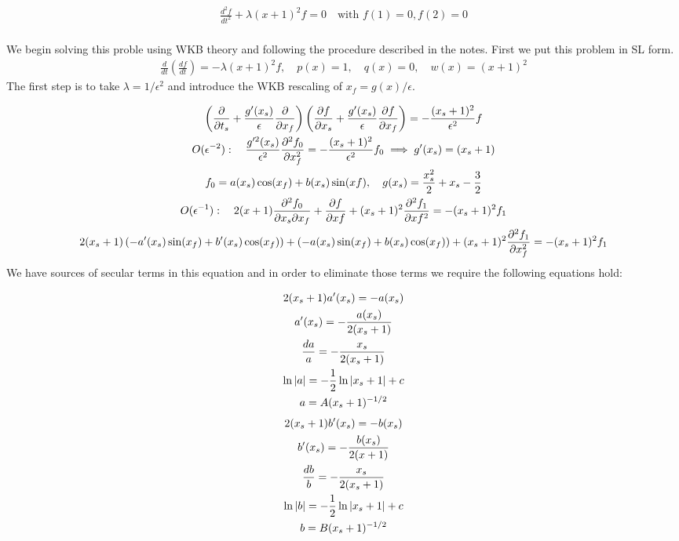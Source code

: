 \documentclass{article}
\begin{document}
\begin{gather*}
    \frac{d^2f}{dt^2} + \lambda(x+1)^2f = 0 \quad \text{with } f(1) = 0, f(2) =
    0\\
\end{gather*}

We begin solving this proble using WKB theory and following the procedure
described in the notes. First we put this problem in SL form. 
\begin{gather*}
    \frac{d}{dt}\left(\frac{df}{dt}\right) = -\lambda(x+1)^2f, \quad p(x) = 1,
    \quad q(x) = 0, \quad w(x) = (x+1)^2
\end{gather*}
The first step is to take $\lambda = 1/\epsilon^2$ and introduce the WKB
rescaling of $x_f = g(x)/\epsilon$. 

\begin{gather*}
    \left(\frac{\partial}{\partial t_s} + \frac{g'(x_s)}{\epsilon}
    \frac{\partial}{\partial x_f}\right)\left(\frac{\partial f}{\partial x_s} +
    \frac{g'(x_s)}{\epsilon}
    \frac{\partial f}{\partial x_f}\right) = -\frac{(x_s+1)^2}{\epsilon^2}f\\
    O(\epsilon^{-2}): \quad \frac{g'^2(x_s)}{\epsilon^2}\frac{\partial^2 f_0}{\partial x_f^2} = -
    \frac{(x_s+1)^2}{\epsilon^2}f_0 \implies g'(x_s) = (x_s+1)\\
    f_0 = a(x_s)\cos(x_f) + b(x_s)\sin(xf), \quad g(x_s) = \frac{x_s^2}{2} + x_s
    - \frac{3}{2}\\
    O(\epsilon^{-1}): \quad 2(x+1)\frac{\partial^2 f_0}{\partial
    x_s\partial x_f} + \frac{\partial f}{\partial xf} +
    (x_s+1)^2 \frac{\partial^2f_1}{\partial xf^2} = 
    - (x_s+1)^2f_1\\
    2(x_s+1)\left(-a'(x_s)\sin(x_f) + b'(x_s)\cos(x_f)\right) +
    \left(-a(x_s)\sin(x_f) + b(x_s)\cos(x_f)\right) +
    (x_s+1)^2\frac{\partial^2f_1}{\partial x_f^2} = -(x_s+1)^2f_1
\end{gather*}
We have sources of secular terms in this equation and in order to eliminate
those terms we require the following equations hold:

    \begin{gather*}
        2(x_s+1)a'(x_s) = -a(x_s)\\
        a'(x_s) = -\frac{a(x_s)}{2(x_s+1)}\\
        \frac{da}{a} = -\frac{x_s}{2(x_s+1)}\\
        \ln|a| = -\frac{1}{2}\ln|x_s+1| + c\\
        a = A(x_s+1)^{-1/2}
    \end{gather*}
\emp
{}
    \begin{gather*}
        2(x_s+1)b'(x_s) = -b(x_s)\\
        b'(x_s) = -\frac{b(x_s)}{2(x+1)}\\
        \frac{db}{b} = -\frac{x_s}{2(x_s+1)}\\
        \ln|b| = -\frac{1}{2}\ln|x_s+1| + c\\
        b = B(x_s+1)^{-1/2}
    \end{gather*}
\emp
\end{document}
